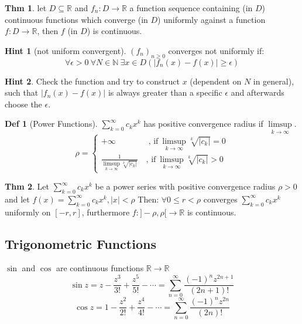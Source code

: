 \documentclass[a4paper, 10pt]{article}
\theoremstyle{definition}
\newtheorem*{theorem}{Thm}
\newtheorem*{definition}{Def}
\newtheorem*{note_wrapper}{Hint}
\theoremstyle{named}
\newenvironment{note}%
    {\begin{mdframed}[style=trick]\begin{note_wrapper}}%
    {\end{note_wrapper}\end{mdframed}}
\newcommand{\R}{\mathbb{R}}
\newcommand{\N}{\mathbb{N}}
\begin{document}
\begin{theorem}
    let $D \subseteq \R$ and $f_n: D \to \R$ a function sequence containing (in $D$) continuous functions which converge (in $D$) uniformly against a function $f: D \to \R$, then $f$ (in $D$) is continuous.
\end{theorem}

\begin{note}[not uniform convergent] $(f_n)_{n \geq 0}$ converges not uniformly if:
    $$\forall \epsilon > 0 \ \forall N \in \N \ \exists x \in D (|f_n(x) - f(x)| \geq \epsilon)$$
\end{note}

\begin{note}
    Check the function and try to construct $x$ (dependent on $N$ in general), such that $|f_n(x) - f(x)|$ is always greater than a specific $\epsilon$ and afterwards choose the $\epsilon$.
\end{note}

\begin{definition}[Power Functions]
    $\sum_{k = 0}^\infty c_k x^k$ has positive convergence radius if $\underset{k \to \infty}{\limsup}$.
    $$\rho = \begin{cases}
        + \infty \quad \quad \quad \quad \text{, if} \ \underset{k \to \infty}{\limsup} \sqrt[k]{|c_k|} = 0 \\
        \frac{1}{\underset{k \to \infty}{\limsup} \sqrt[k]{|c_k|}} \quad \text{, if} \ \underset{k \to \infty}{\limsup} \sqrt[k]{|c_k|} > 0
    \end{cases}$$
\end{definition}

\begin{theorem}
    Let $\sum_{k=0}^\infty c_kx^k$ be a power series with positive convergence radius $\rho > 0$ and let $f(x) = \sum_{k=0}^\infty c_kx^k, |x| < \rho$ Then: $\forall 0 \leq r < \rho$ converges $\sum_{k=0}^\infty c_kx^k$ uniformly on $[-r,r]$, furthermore  $f: ]-\rho, \rho[ \to \mathbb{R}$ is continuous.
\end{theorem}

\subsection{Trigonometric Functions}
$\sin$ and $\cos$ are continuous functions $\R \to \R$
$$\sin z = z - \frac{z^3}{3!} + \frac{z^5}{5!} - \cdots = \sum_{n = 0}^\infty \frac{(-1)^n z^{2n + 1}}{(2n + 1)!}$$
$$\cos z = 1 - \frac{z^2}{2!} + \frac{z^4}{4!} - \cdots = \sum_{n = 0}^\infty \frac{(-1)^n z^{2n}}{(2n)!}$$
\end{document}
